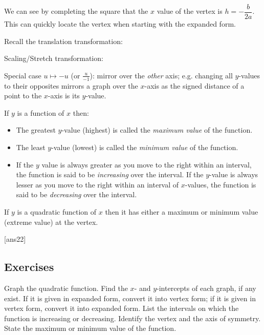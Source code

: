 \documentclass{amsbook}
\numberwithin{section}{chapter}
\numberwithin{equation}{chapter}
\begin{document}
We can see by completing the square that the $x$ value of the vertex is $h=-\dfrac{b}{2a}$. This can quickly locate the vertex when starting with the expanded form.

\bigskip
Recall the translation transformation: 



\bigskip
Scaling/Stretch transformation:



Special case $u \mapsto -u$ (or $\frac{u}{-1}$): mirror over the \textit{other} axis; e.g. changing all $y$-values to their opposites mirrors a graph over the $x$-axis as the signed distance of a point to the $x$-axis is its $y$-value.

If $y$ is a function of $x$ then:
\begin{itemize}
	\item The greatest $y$-value (highest) is called the \textit{maximum value} of the function.
	\item The least $y$-value (lowest) is called the \textit{minimum value} of the function.
	\item If the $y$ value is always greater as you move to the right within an interval, the function is said to be \textit{increasing}  over the interval.
	 If the $y$-value is always lesser as you move to the right within an interval of $x$-values, the function is said to be \textit{decreasing}  over the interval.
\end{itemize}

If $y$ is a quadratic function of $x$ then it has either a maximum or minimum value (extreme value) at the vertex.


[ans22]
\subsection*{Exercises \nopunct} \hfill

Graph the quadratic function.  Find the $x$- and $y$-intercepts of each graph, if any exist.  If it is given in expanded form, convert it into vertex form; if it is given in vertex form, convert it into expanded form.  List the intervals on which the function is increasing or decreasing.  Identify the vertex and the axis of symmetry. State the maximum or minimum value of the function.
\end{document}
